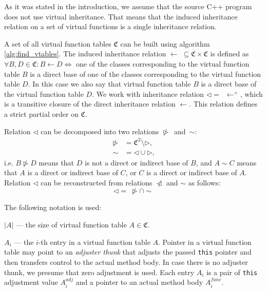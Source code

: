 \documentclass[times, 10pt,twocolumn]{article}
\newcommand{\gC}{\mathfrak{C}}
\newcommand{\func}{\textit{func}}
\newcommand{\adj}{\textit{adj}}
\newcommand{\nlhd}{\ntriangleleft}
\newcommand{\nrhd}{\ntriangleright}
\begin{document}
As it was stated in the introduction,
we assume that the source C++ program does not use virtual inheritance.
That means that the induced inheritance relation
on a set of virtual functions is a single inheritance relation. 

A set of all virtual function tables $\gC$
can be built using algorithm \ref{alg:find_vtables}.
The induced inheritance relation $\leftarrow \; \subseteq \gC \times \gC$
is defined as $\forall B, D \in \gC: B \leftarrow D \Longleftrightarrow$
one of the classes corresponding to the virtual function table $B$
is a direct base of one of the classes corresponding
to the virtual function table $D$.
In this case we also say that virtual function table $B$
is a direct base of the virtual function table $D$.
We work with inheritance relation $\lhd = \enspace \leftarrow^+$,
which is a transitive closure of the direct inheritance relation $\leftarrow$.
This relation defines a strict partial order on $\gC$.


Relation $\lhd$ can be decomposed into two relations $\nrhd$~and~$\sim$:
\begin{equation}\label{eq:nrhd_sim_def}
\begin{aligned}
\nrhd &= \gC^2 \setminus \rhd \text{,} \\
\sim &= \lhd \cup \rhd \text{,}
\end{aligned}
\end{equation}
i.e. $B \nrhd D$ means that $D$ is not a direct or indirect base of $B$,
and $A \sim C$ means that $A$ is a direct or indirect base of $C$,
or $C$ is a direct or indirect base of $A$.
Relation $\lhd$ can be reconstructed from relations $\nlhd$ and $\sim$
as follows:
\begin{equation}
\lhd = \: \nrhd \cap \sim
\end{equation}

The following notation is used:

$|A|$ --- the size of virtual function table $A \in \gC$.

$A_i$ --- the $i$-th entry in a virtual function table $A$.
Pointer in a virtual function table may point to an \textit{adjuster thunk}
that adjusts the passed \lstinline{this} pointer and then transfers control
to the actual method body.
In case there is no adjuster thunk, we presume that zero adjustment is used.
Each entry $A_i$ is a pair of \lstinline{this} adjustment
value $A_i^{\adj}$ and a pointer to an actual method body $A_i^{\func}$.
\end{document}

